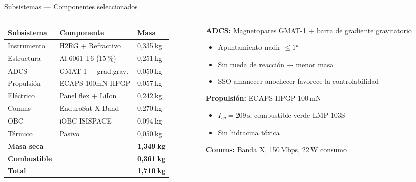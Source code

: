 \documentclass[10pt, aspectratio=169]{beamer}
\begin{document}
\begin{frame}{Subsistemas — Componentes seleccionados}
  \begin{columns}[T]
    \begin{column}{0.48\textwidth}
      \begin{tabular}{@{}lll@{}}
        \toprule
        \textbf{Subsistema} & \textbf{Componente} & \textbf{Masa} \\
        \midrule
        Instrumento & H2RG + Refractivo & 0,335\,kg \\
        Estructura  & Al 6061-T6 (15\,\%)& 0,251\,kg \\
        ADCS        & GMAT-1 + grad.grav.& 0,050\,kg \\
        Propulsión  & ECAPS 100mN HPGP  & 0,057\,kg \\
        Eléctrico   & Panel flex + LiIon & 0,242\,kg \\
        Comms       & EnduroSat X-Band  & 0,270\,kg \\
        OBC         & iOBC ISISPACE     & 0,094\,kg \\
        Térmico     & Pasivo            & 0,050\,kg \\
        \midrule
        \textbf{Masa seca} & & \textbf{1,349\,kg} \\
        \textbf{Combustible} & & \textbf{0,361\,kg} \\
        \textbf{Total} & & \textbf{1,710\,kg} \\
        \bottomrule
      \end{tabular}
    \end{column}
    \begin{column}{0.48\textwidth}
      \textbf{ADCS:} Magnetopares GMAT-1 + barra de gradiente gravitatorio
      \begin{itemize}
        \item Apuntamiento nadir $\leq 1°$
        \item Sin rueda de reacción → menor masa
        \item SSO amanecer-anochecer favorece la controlabilidad
      \end{itemize}
      \medskip
      \textbf{Propulsión:} ECAPS HPGP 100\,mN
      \begin{itemize}
        \item $I_{sp} = 209\,\text{s}$, combustible verde LMP-103S
        \item Sin hidracina tóxica
      \end{itemize}
      \medskip
      \textbf{Comms:} Banda X, 150\,Mbps, 22\,W consumo
    \end{column}
  \end{columns}
\end{frame}
\end{document}
